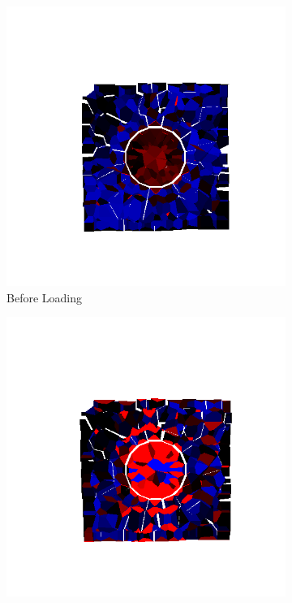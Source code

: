 \begin{figure}[ht!]
\centering

    \begin{subfigure}{.33\textwidth}
      \centering
      \includegraphics[width=1.0\linewidth]{Files/Small_ASR/IS2/DEP5-STEP(020).png}
      \caption{Before Loading}
    \end{subfigure}%
    \begin{subfigure}{.33\textwidth}
      \centering
      \includegraphics[width=1.0\linewidth]{Files/Small_ASR/IS2/DEP5-STEP(040).png}

\end{subfigure}
\end{figure}
